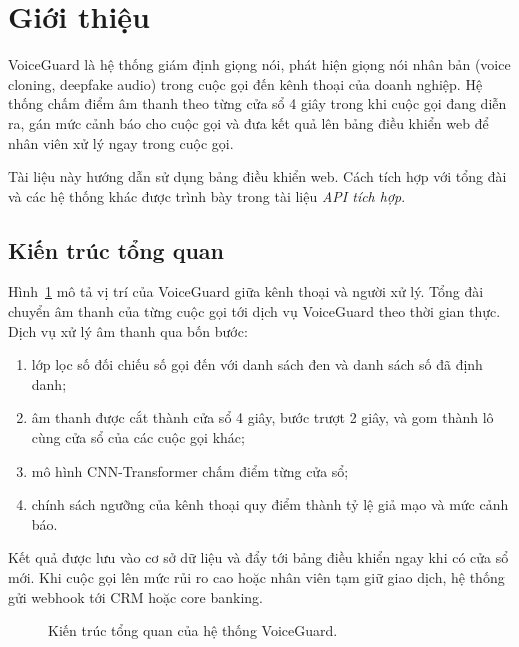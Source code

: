 \documentclass[11pt]{article}
\begin{document}

\tableofcontents
\clearpage

\section{Giới thiệu}

VoiceGuard là hệ thống giám định giọng nói, phát hiện giọng nói nhân bản (voice cloning, deepfake audio) trong cuộc gọi đến kênh thoại của doanh nghiệp. Hệ thống chấm điểm âm thanh theo từng cửa sổ 4 giây trong khi cuộc gọi đang diễn ra, gán mức cảnh báo cho cuộc gọi và đưa kết quả lên bảng điều khiển web để nhân viên xử lý ngay trong cuộc gọi.

Tài liệu này hướng dẫn sử dụng bảng điều khiển web. Cách tích hợp với tổng đài và các hệ thống khác được trình bày trong tài liệu \emph{API tích hợp}.

\subsection{Kiến trúc tổng quan}

Hình~\ref{fig:arch} mô tả vị trí của VoiceGuard giữa kênh thoại và người xử lý. Tổng đài chuyển âm thanh của từng cuộc gọi tới dịch vụ VoiceGuard theo thời gian thực. Dịch vụ xử lý âm thanh qua bốn bước:
\begin{enumerate}
  \item lớp lọc số đối chiếu số gọi đến với danh sách đen và danh sách số đã định danh;
  \item âm thanh được cắt thành cửa sổ 4 giây, bước trượt 2 giây, và gom thành lô cùng cửa sổ của các cuộc gọi khác;
  \item mô hình CNN-Transformer chấm điểm từng cửa sổ;
  \item chính sách ngưỡng của kênh thoại quy điểm thành tỷ lệ giả mạo và mức cảnh báo.
\end{enumerate}
Kết quả được lưu vào cơ sở dữ liệu và đẩy tới bảng điều khiển ngay khi có cửa sổ mới. Khi cuộc gọi lên mức rủi ro cao hoặc nhân viên tạm giữ giao dịch, hệ thống gửi webhook tới CRM hoặc core banking.

\begin{figure}[tbp]
  \centering
  \resizebox{\linewidth}{!}{}
  \caption{Kiến trúc tổng quan của hệ thống VoiceGuard.}
  \label{fig:arch}
\end{figure}
\end{document}
